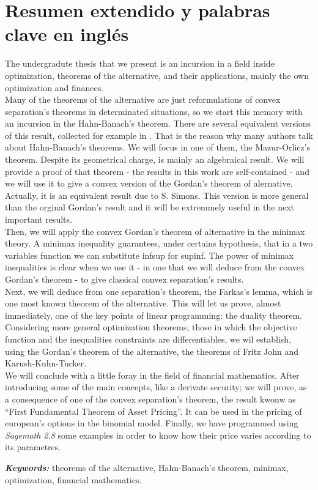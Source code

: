 \chapter{Resumen extendido y palabras clave en inglés}
The undergradute thesis that we present is an incursion in a field inside optimization, theorems of the alternative, and their applications, mainly the own optimization and finances.\\

Many of the theorems of the alternative are just reformulations of convex separation's theorems in determinated situations, so we start this memory with an incursion in the Hahn-Banach's theorem. There are several equivalent versions of this result, collected for example in \cite{schechter1996handbook}. That is the reason why many authors talk about Hahn-Banach's theorems. We will focus in one of them, the Mazur-Orlicz's theorem. Despite its geometrical charge, is mainly an algebraical result. We will provide a proof of that theorem - the results in this work are self-contained -  and we will use it to give a convex version  of the Gordan's theorem of alernative. Actually, it is an equivalent result due to S. Simons. This version is more general than the orginal Gordan's result and it will be extremmely useful in the next important results. \\

Then, we will apply the convex Gordan's theorem of alternative in the minimax theory. A minimax inequality guarantees, under certains hypothesis, that in a two variables function we can substitute inf\hspace{0.5mm}sup for sup\hspace{0.5mm}inf. The power of minimax inequalities is clear when we use it - in one that we will deduce from the convex Gordan's theorem - to give classical convex separation's results. \\

Next, we will deduce from one separation's theorem, the Farkas's lemma, which is one most known theorem of the alternative. This will let us prove, almost immediately, one of the key points of linear programming: the duality theorem. Considering more general optimization theorems, those in which the objective function and the inequalities constraints are differentiables, we wil establish, using the Gordan's theorem of the alternative, the theorems of Fritz John and Karush-Kuhn-Tucker.\\

We will conclude with a little foray in the field of financial mathematics. After introducing some of the main concepts, like a derivate security; we will prove, as a consequence of one of the convex separation's theorem, the result kwonw as ``First Fundamental Theorem of Asset Pricing''. It can be used in the pricing of european's options in the binomial model. Finally, we have programmed using \textit{Sagemath 2.8} some examples in order to know how their price varies according to its parametres.\\

\providecommand{\keywords}[1]
{
	\small	
	\textbf{\textit{Keywords: }} #1
}
\keywords{theorems of the alternative, Hahn-Banach's theorem, minimax, optimization, financial mathematics.}